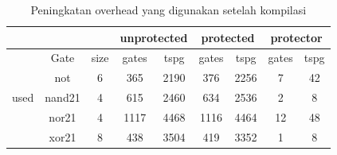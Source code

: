\begin{table}[htbp]
  \centering
  \caption{Peningkatan overhead yang digunakan setelah kompilasi}
    \begin{tabular}{lllllllll}
    \hline
    \multicolumn{3}{|c|}{} & \multicolumn{2}{c|}{\cellcolor[rgb]{ .851,  .851,  .851}unprotected} & \multicolumn{2}{c|}{\cellcolor[rgb]{ .851,  .851,  .851}protected} & \multicolumn{2}{c|}{\cellcolor[rgb]{ .851,  .851,  .851}protector} \bigstrut\\
    \hline
    \multicolumn{1}{c|}{\multirow{7}[14]{*}{used}} & \multicolumn{1}{c|}{Gate} & \multicolumn{1}{c|}{size} & \multicolumn{1}{c|}{\cellcolor[rgb]{ .851,  .851,  .851}gates} & \multicolumn{1}{c|}{tspg} & \multicolumn{1}{c|}{\cellcolor[rgb]{ .851,  .851,  .851}gates} & \multicolumn{1}{c|}{tspg} & \multicolumn{1}{c|}{\cellcolor[rgb]{ .851,  .851,  .851}gates} & \multicolumn{1}{c|}{tspg} \bigstrut\\
\cline{2-9}    \multicolumn{1}{c|}{} & \multicolumn{1}{c|}{not} & \multicolumn{1}{c|}{6} & \multicolumn{1}{c|}{\cellcolor[rgb]{ .851,  .851,  .851}365} & \multicolumn{1}{c|}{2190} & \multicolumn{1}{c|}{\cellcolor[rgb]{ .851,  .851,  .851}376} & \multicolumn{1}{c|}{2256} & \multicolumn{1}{c|}{\cellcolor[rgb]{ .851,  .851,  .851}7} & \multicolumn{1}{c|}{42} \bigstrut\\
\cline{2-9}    \multicolumn{1}{c|}{} & \multicolumn{1}{c|}{nand21} & \multicolumn{1}{c|}{4} & \multicolumn{1}{c|}{\cellcolor[rgb]{ .851,  .851,  .851}615} & \multicolumn{1}{c|}{2460} & \multicolumn{1}{c|}{\cellcolor[rgb]{ .851,  .851,  .851}634} & \multicolumn{1}{c|}{2536} & \multicolumn{1}{c|}{\cellcolor[rgb]{ .851,  .851,  .851}2} & \multicolumn{1}{c|}{8} \bigstrut\\
\cline{2-9}    \multicolumn{1}{c|}{} & \multicolumn{1}{c|}{nor21} & \multicolumn{1}{c|}{4} & \multicolumn{1}{c|}{\cellcolor[rgb]{ .851,  .851,  .851}1117} & \multicolumn{1}{c|}{4468} & \multicolumn{1}{c|}{\cellcolor[rgb]{ .851,  .851,  .851}1116} & \multicolumn{1}{c|}{4464} & \multicolumn{1}{c|}{\cellcolor[rgb]{ .851,  .851,  .851}12} & \multicolumn{1}{c|}{48} \bigstrut\\
\cline{2-9}    \multicolumn{1}{c|}{} & \multicolumn{1}{c|}{xor21} & \multicolumn{1}{c|}{8} & \multicolumn{1}{c|}{\cellcolor[rgb]{ .851,  .851,  .851}438} & \multicolumn{1}{c|}{3504} & \multicolumn{1}{c|}{\cellcolor[rgb]{ .851,  .851,  .851}419} & \multicolumn{1}{c|}{3352} & \multicolumn{1}{c|}{\cellcolor[rgb]{ .851,  .851,  .851}1} & \multicolumn{1}{c|}{8} \bigstrut\\

\end{tabular}
\end{table}
